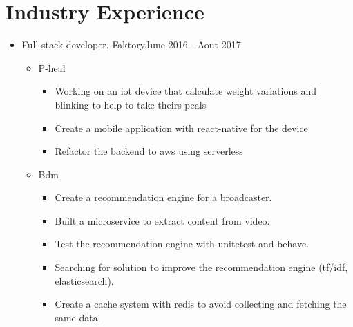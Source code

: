 \documentclass[11pt,letter,sans]{moderncv}
\begin{document}
\hypersetup{linkcolor=color0,urlcolor=color1}
\makecvtitle

\vspace{-7mm}
\section{Industry Experience}
  \begin{itemize}
      \item Full stack developer, Faktory\hfill June 2016 - Aout 2017
      \begin{itemize}
            \item P-heal 
\begin{itemize}
                \item Working on an iot device that calculate weight variations and blinking to help to take theirs peals
              \end{itemize}
\begin{itemize}
                \item Create a mobile application with react-native for the device
              \end{itemize}
\begin{itemize}
                \item Refactor the backend to aws using serverless
              \end{itemize}
            \item Bdm 
\begin{itemize}
                \item Create a recommendation engine for a broadcaster.
              \end{itemize}
\begin{itemize}
                \item Built a microservice to extract content from video.
              \end{itemize}
\begin{itemize}
                \item Test the recommendation engine with unitetest and behave.
              \end{itemize}
\begin{itemize}
                \item Searching for solution to improve the recommendation engine (tf/idf, elasticsearch).
              \end{itemize}
\begin{itemize}
                \item Create a cache system with redis to avoid collecting and fetching the same data.

\end{itemize}
\end{itemize}
\end{itemize}
\end{document}
